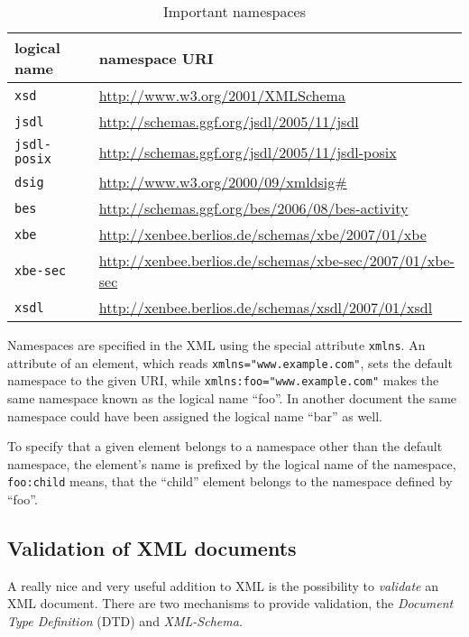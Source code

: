\medskip

\begin{table}[ht]
  \centering
  \begin{tabular}{@{}ll@{}}\toprule
    logical name        & \multicolumn{1}{l}{namespace URI} \\ \midrule %
    \texttt{xsd}        & \url{http://www.w3.org/2001/XMLSchema} \\
    \texttt{jsdl}       & \url{http://schemas.ggf.org/jsdl/2005/11/jsdl} \\
    \texttt{jsdl-posix} &  \url{http://schemas.ggf.org/jsdl/2005/11/jsdl-posix} \\
    \texttt{dsig}       & \url{http://www.w3.org/2000/09/xmldsig#} \\
    \texttt{bes}        & \url{http://schemas.ggf.org/bes/2006/08/bes-activity} \\
    \texttt{xbe}        & \url{http://xenbee.berlios.de/schemas/xbe/2007/01/xbe} \\
    \texttt{xbe-sec}    & \url{http://xenbee.berlios.de/schemas/xbe-sec/2007/01/xbe-sec} \\
    \texttt{xsdl}       & \url{http://xenbee.berlios.de/schemas/xsdl/2007/01/xsdl} \\
    \bottomrule
  \end{tabular}
  \caption[XML Namespaces used in this work]{Important namespaces}
  \label{tab:namespaces}
\end{table}

Namespaces  are   specified  in  the  XML  using   the  special  attribute
\texttt{xmlns}.     An   attribute    of   an    element,    which   reads
\texttt{xmlns="www.example.com"}, sets the  default namespace to the given
URI, while  \texttt{xmlns:foo="www.example.com"} makes the  same namespace
known as the logical name  ``foo''. In another document the same namespace
could have been assigned the logical name ``bar'' as well.

To specify  that a  given element  belongs to a  namespace other  than the
default namespace, the  element's name is prefixed by  the logical name of
the namespace,  \eg \texttt{foo:child} means, that  the ``child'' element
belongs to the namespace defined by ``foo''.

\subsection{Validation of XML documents}
\label{sec:xml-validation}

A  really nice  and very  useful  addition to  XML is  the possibility  to
\emph{validate}  an XML  document.  There  are two  mechanisms  to provide
validation,    the    \emph{Document    Type   Definition}    (DTD)    and
\emph{XML-Schema}.

